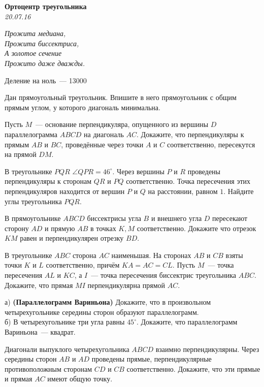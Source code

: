 \begin{center}
\textbf{\Large Ортоцентр треугольника}\\
\textit{20.07.16}
\end{center}

\epigraph{\it Прожита медиана,\\
Прожита биссектриса,\\
А золотое сечение\\
Прожито даже дважды.}{Деление на ноль~--- 13000}

\begin{problems}
\item Дан прямоугольный треугольник. Впишите в него прямоугольник с общим прямым углом, у которого диагональ минимальна.

\item Пусть $M$~--- основание перпендикуляра, опущенного из вершины $D$ параллелограмма $ABCD$ на диагональ $AC$. Докажите, что перпендикуляры к прямым $AB$ и $BC$, проведённые через точки $A$ и $C$ соответственно, пересекутся на прямой $DM$.

\item В треугольнике $PQR$  $\angle QPR=46^{\circ}$. Через вершины $P$ и $R$ проведены перпендикуляры к сторонам $QR$ и $PQ$ соответственно. Точка пересечения этих перпендикуляров находится от вершин $P$ и $Q$ на расстоянии, равном $1$. Найдите углы треугольника $PQR$.

\item В прямоугольнике $ABCD$ биссектрисы угла $B$ и внешнего угла $D$ пересекают сторону $AD$ и прямую $AB$ в точках $K, M$ соответственно. Докажите что отрезок $KM$ равен и перпендикулярен отрезку $BD$.

\item В треугольнике $ABC$ сторона $AC$ наименьшая. На сторонах $AB$ и $CB$ взяты точки $K$ и $L$ соответственно, причём  $KA = AC = CL$.  Пусть $M$~--- точка пересечения $AL$ и $KC$, а $I$~--- точка пересечения биссектрис треугольника $ABC$. Докажите, что прямая $MI$ перпендикулярна прямой $AC$.

\item а) \textbf{(Параллелограмм Вариньона)} Докажите, что в произвольном четырехугольнике середины сторон образуют параллелограмм.\\
б) В четырехугольнике три угла равны $45^{\circ}$. Докажите, что параллелограмм Вариньона~--- квадрат.

\item Диагонали выпуклого четырехугольника $ABCD$ взаимно перпендикулярны. Через середины сторон $AB$ и $AD$ проведены прямые, перпендикулярные противоположным сторонам $CD$ и $CB$ соответственно. Докажите, что эти прямые и прямая $AC$ имеют общую точку.


\end{problems}
